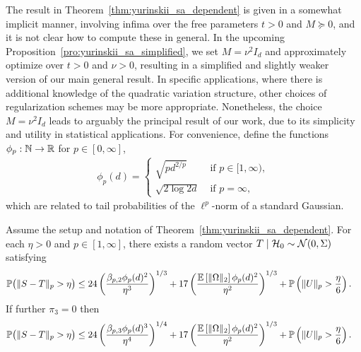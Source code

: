 The result in Theorem~\ref{thm:yurinskii_sa_dependent} is given in a somewhat
implicit
manner, involving infima over the free parameters $t > 0$ and $M \succeq 0$,
and it is not clear how to compute these in general. In the upcoming
Proposition~\ref{pro:yurinskii_sa_simplified}, we set $M = \nu^2 I_d$ and
approximately
optimize over $t > 0$ and $\nu > 0$, resulting in a simplified and slightly
weaker version of our main general result. In specific applications, where
there is additional knowledge of the quadratic variation structure, other
choices of regularization schemes may be more appropriate. Nonetheless, the
choice $M = \nu^2 I_d$ leads to arguably the principal result of our work,
due to its simplicity and utility in statistical applications. For convenience,
define the functions $\phi_p : \mathbb{N} \to \mathbb{R}$ for $p \in [0, \infty]$,
%
\begin{align*}
  \phi_p(d) =
  \begin{cases}
    \sqrt{pd^{2/p} } & \text{ if } p \in [1,\infty), \\
    \sqrt{2\log 2d} & \text{ if } p =\infty,
  \end{cases}
\end{align*}
%
which are related to tail probabilities
of the $\ell^p$-norm of a standard Gaussian.

\begin{proposition}%
  \label{pro:yurinskii_sa_simplified}

  Assume the setup and notation of Theorem~\ref{thm:yurinskii_sa_dependent}.
  For each $\eta > 0$ and $p \in [1,\infty]$,
  there exists a random vector $T \mid \mathcal{H}_0 \sim \mathcal{N}(0, \Sigma)$ satisfying
  \begin{align*}
    \mathbb{P}\big(\|S-T\|_p > \eta\big)
    &\leq
    24 \left(
      \frac{\beta_{p,2} \phi_p(d)^2}{\eta^3}
    \right)^{1/3}
    + 17 \left(
      \frac{\mathbb{E} \left[ \|\Omega\|_2 \right] \phi_p(d)^2}{\eta^2}
    \right)^{1/3}
    +\mathbb{P}\left(\|U\|_p>\frac{\eta}{6}\right).
  \end{align*}
  If further $\pi_3 = 0$ then
  \begin{align*}
    \mathbb{P}\big(\|S-T\|_p > \eta\big)
    &\leq
    24 \left(
      \frac{\beta_{p,3} \phi_p(d)^3}{\eta^4}
    \right)^{1/4}
    + 17 \left(
      \frac{\mathbb{E} \left[ \|\Omega\|_2 \right] \phi_p(d)^2}{\eta^2}
    \right)^{1/3}
    +\mathbb{P}\left(\|U\|_p>\frac{\eta}{6}\right).
  \end{align*}
\end{proposition}

